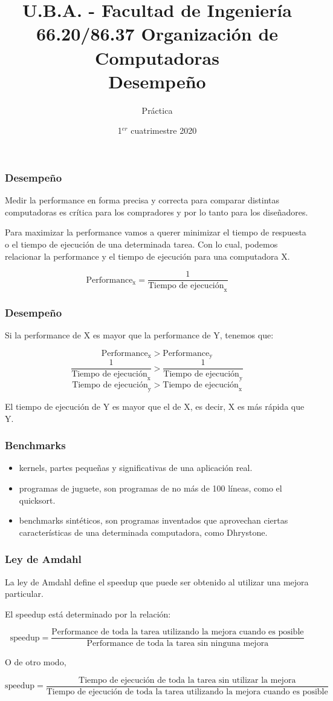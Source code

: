 \documentclass{beamer}
\title[66.20/86.37]{U.B.A. - Facultad de Ingeniería\\\vspace{0.25cm} 66.20/86.37 Organización de Computadoras
\\Desempeño}
\author{Práctica}
\date{1$^{er}$ cuatrimestre 2020}
\begin{document}
\begin{frame}
\titlepage %
\end{frame}

\begin{frame}
\frametitle{Desempeño}
Medir la performance en forma precisa y correcta para comparar distintas computadoras es crítica para los compradores y por lo tanto para los diseñadores.

\bigskip
Para maximizar la performance vamos a querer minimizar el tiempo de respuesta o el tiempo de ejecución de una determinada tarea. Con lo cual, podemos relacionar la performance y el tiempo de ejecución para una computadora X.

\[ \text{Performance}_\text{x} = \frac{1}{\text{Tiempo de ejecución}_\text{x}} \]
\end{frame}

\begin{frame}
\frametitle{Desempeño}
Si la performance de X es mayor que la performance de Y, tenemos que:

\[ \text{Performance}_\text{x} > \text{Performance}_\text{y} \]
\[ \frac{1}{\text{Tiempo de ejecución}_\text{x}} > \frac{1}{\text{Tiempo de ejecución}_\text{y}} \]
\[ \text{Tiempo de ejecución}_\text{y} > \text{Tiempo de ejecución}_\text{x} \]

\bigskip
El tiempo de ejecución de Y es mayor que el de X, es decir, X es más rápida que Y.

\end{frame}

\begin{frame}
\frametitle{Benchmarks}
\begin{itemize}
\item kernels, partes pequeñas y significativas de una aplicación real.
\item programas de juguete, son programas de no más de 100 líneas, como el quicksort.
\item benchmarks sintéticos, son programas inventados que aprovechan ciertas características de una determinada computadora, como Dhrystone.
\end{itemize}
\end{frame}

\begin{frame}
\frametitle{Ley de Amdahl}
La ley de Amdahl define el speedup que puede ser obtenido al utilizar una mejora particular. 

\bigskip
El speedup está determinado por la relación:

\tiny
\[\text{speedup} = \frac{\text{Performance de toda la tarea utilizando la mejora cuando es posible}}{\text{Performance de toda la tarea sin ninguna mejora}} \]

\bigskip
\normalsize
O de otro modo,

\tiny
\[\text{speedup} = \frac{\text{Tiempo de ejecución de toda la tarea sin utilizar la mejora}}{\text{Tiempo de ejecución de toda la tarea utilizando la mejora cuando es posible}} \]

\end{frame}
\end{document}
